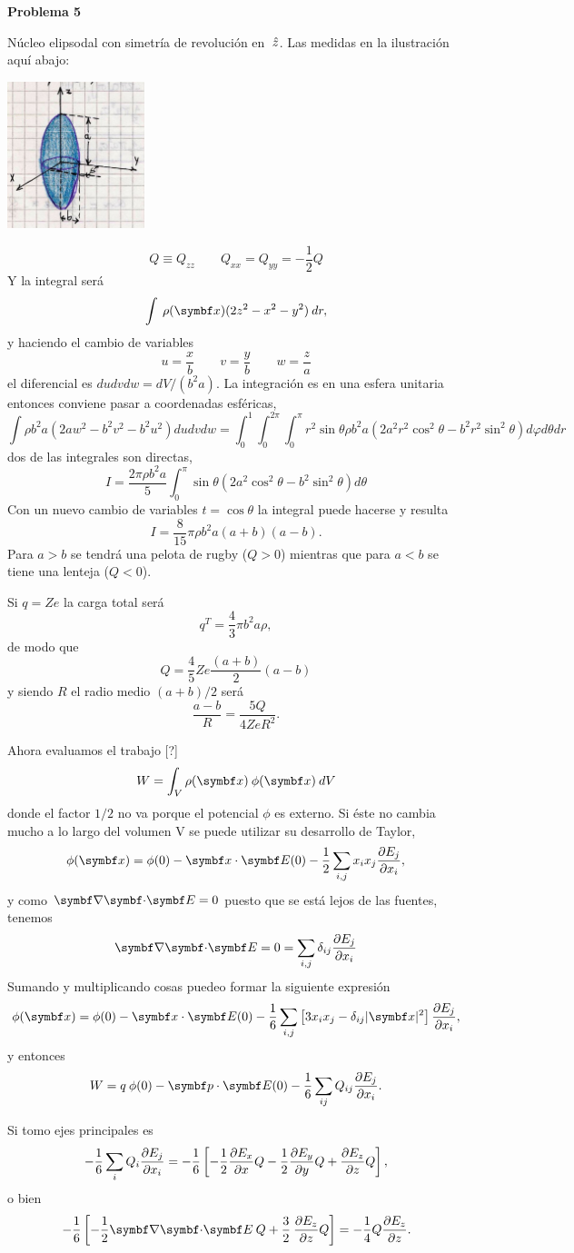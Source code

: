 \documentclass[10pt,oneside]{CBFT_book}
\begin{document}
\begin{ejemplo}{\bf Problema 5}

Núcleo elipsodal con simetría de revolución en $\:\hat{z}$. Las medidas en la ilustración aquí abajo:

\includegraphics[width=0.3\textwidth]{images/fig_ft1_problema_5.jpg}
 
\[
	Q \equiv Q_{zz} \qquad Q_{xx} = Q_{yy} = - \frac{1}{2} Q
\]
Y la integral será
\[
	\int \: \rho(\vbx) ( 2 z^2 - x^2 - y^2 ) \: dr,
\]
y haciendo el cambio de variables
\[
	u = \frac{x}{b} \qquad v = \frac{y}{b} \qquad w = \frac{z}{a}
\]
el diferencial es $du dv dw = dV / (b^2a)$. La integración es en una esfera unitaria entonces
conviene pasar a coordenadas esféricas,
\[
	\int \rho b^2 a (2aw^2 - b^2v^2 - b^2u^2) du dv dw =
	\int_0^1 \int_0^{2\pi} \int_0^\pi r^2 \sin\theta \rho b^2 a 
	( 2 a^2r^2 \cos^2\theta - b^2r^2\sin^2\theta) d\varphi d\theta dr
\]
dos de las integrales son directas,
\[
	I = \frac{ 2 \pi \rho b^2 a }{ 5 } \int_0^\pi \sin\theta  
	( 2 a^2 \cos^2\theta - b^2 \sin^2\theta) d\theta
\]
Con un nuevo cambio de variables $t = \cos \theta$ la integral puede hacerse y resulta
\[
	I = \frac{8}{15} \pi \rho b^2 a (a+b) (a-b).
\]
Para $a>b$ se tendrá una pelota de rugby ($Q>0$) mientras que para $a<b$ se tiene una lenteja
($Q<0$).
 
Si $q=Ze$  la carga total será 
\[
	q^T = \frac{4}{3} \pi b^2 a \rho,
\]
de modo que 
\[
	Q = \frac{4}{5} Z e \frac{(a+b)}{2} (a-b)
\]
y siendo $R$ el radio medio ${(a+b)}/{2}$ será
\[
	\frac{a-b}{R} = \frac{5Q}{4ZeR^2}.
\]
 
Ahora evaluamos el trabajo [?] 
\[
	W = \int_V \rho(\vbx) \: \phi(\vbx) \: dV
\]
donde el factor $1/2$ no va porque el potencial $\phi$ es externo. Si éste no cambia mucho a lo
largo del volumen V se puede utilizar su desarrollo de Taylor,
\[
	\phi(\vbx) = \phi(0) - \vbx \cdot \vb{E}(0) - \frac{1}{2} \sum_{i,j} x_i x_j \dpar{E_j}{x_i},
\]
y como $\divem{E}=0$ puesto que se está lejos de las fuentes, tenemos
\[
	\divem{E} = 0 = \sum_{i,j} \delta_{ij} \dpar{E_j}{x_i}
\]
Sumando y multiplicando cosas puedeo formar la siguiente expresión
\[
	\phi(\vbx) = \phi(0) - \vbx \cdot \vb{E}(0) - 
	\frac{1}{6} \sum_{i,j} \left[ 3 x_i x_j - \delta_{ij} |\vbx|^2 \right] \dpar{E_j}{x_i},
\]
y entonces
\[
	W = q \: \phi(0) - \vb{p}\cdot\vb{E}(0) - \frac{1}{6} \sum_{ij} Q_{ij} \dpar{E_j}{x_i}.
\]

Si tomo ejes principales es
\[
	- \frac{1}{6} \sum_{i} Q_{i} \frac{\partial^{\hspace{-0.05em}} {E_j}}{\partial {x_i}^{\hspace{-0.05em}}} =
	- \frac{1}{6} \left[ -\frac{1}{2}\frac{\partial^{\hspace{-0.05em}} {E_x}}{\partial {x}^{\hspace{-0.05em}}} Q -\frac{1}{2}\frac{\partial^{\hspace{-0.05em}} {E_y}}{\partial {y}^{\hspace{-0.05em}}} Q 
	+ \frac{\partial^{\hspace{-0.05em}} {E_z}}{\partial {z}^{\hspace{-0.05em}}} Q \right],
\]
o bien
\[
	- \frac{1}{6} \left[ -\frac{1}{2} \divem{E} \: Q + \frac{3}{2} \: \dpar{E_z}{z} Q \right] =
	- \frac{1}{4} Q \dpar{E_z}{z}.
\]

\end{ejemplo}
\end{document}
